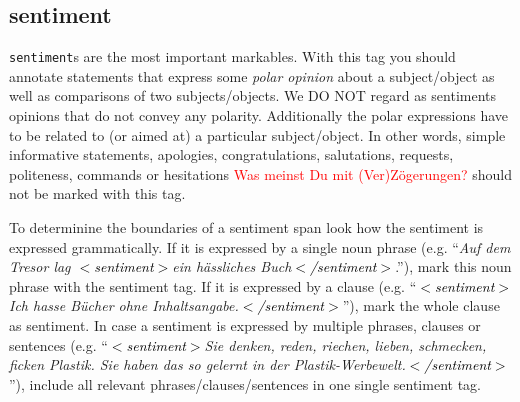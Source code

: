 \documentclass[11pt,a4paper]{article}
\newcommand{\xmltag}[1]{\textcolor{black}{{\small$<$#1$>$}}}
\begin{document}
\subsection{sentiment}
\texttt{sentiment}s are the most important markables. With this tag
you should annotate statements that express some \emph{polar opinion} about
a subject/object as well as comparisons of two subjects/objects. 
We DO NOT regard as sentiments opinions that do not convey any polarity. 
Additionally the polar expressions have to be related to (or aimed at) a particular subject/object. 
In other words, simple informative statements, apologies, congratulations, salutations, requests, politeness, commands or 
hesitations \textcolor{red}{Was meinst Du mit (Ver)Z\"ogerungen?} should not be marked with this tag.

To determinine the boundaries of a sentiment span look how the sentiment
is expressed grammatically. If it is expressed by a single
noun phrase (e.g. ``\textit{Auf dem Tresor lag \xmltag{sentiment}ein
  h\"assliches Buch\xmltag{/sentiment}}.''), mark this noun phrase with the sentiment tag. If
it is expressed by a clause (e.g. ``\textit{\xmltag{sentiment}Ich hasse B\"ucher
  ohne Inhaltsangabe.\xmltag{/sentiment}}''), mark the whole clause as sentiment.
In case a sentiment is expressed by multiple phrases, clauses or sentences
(e.g. ``\textit{\xmltag{sentiment}Sie denken, reden, riechen, lieben,
  schmecken, ficken Plastik. Sie haben das so gelernt in der
  Plastik-Werbewelt.\xmltag{/sentiment}}''), include all relevant phrases/clauses/sentences
 in one single sentiment tag. 
\end{document}

